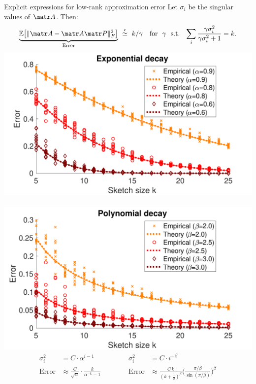 \begin{frame}{Explicit expressions for low-rank approximation error}
  Let $\sigma_i$ be the singular values of $\A$. Then:
  \begin{align*}
    \underbrace{\E\big[\|\A-\A\P\|_F^2\big]}_{\text{Error}} \ \overset\epsilon\simeq\ 
    k/\gamma
\quad \text{for \ $\gamma$ \ s.t. \ } \sum_{i}\frac{\gamma\sigma_i^2}{\gamma\sigma_i^2+1} = k.
  \end{align*}
\includegraphics[width=.495\textwidth]{Figures/projections/explicit_exp}~%
\nolinebreak\includegraphics[width=.495\textwidth]{Figures/projections/explicit_poly}
      \begin{align*}
        \sigma_i^2&=C\cdot\alpha^{i-1}
&&&&&      \sigma_i^2
        &=C\cdot i^{-\beta}
        \\
        \text{Error} & \approx
\frac C{\sqrt\alpha}\cdot
  \frac{k}{\alpha^{-k}-1}
&&&&&  
\text{Error}&\approx
\frac{C\,k}{(k+\frac12)^\beta}\bigg(\frac{\pi/\beta}{\sin(\pi/\beta)}\bigg)^\beta
      \end{align*}
\end{frame}

